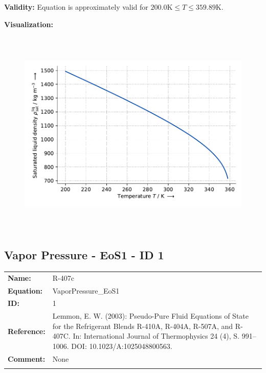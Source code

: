 \textbf{Validity:}
\newline
Equation is approximately valid for $200.0 \si{\kelvin} \leq T \leq 359.89 \si{\kelvin}$.
\newline

\textbf{Visualization:}
%
\begin{figure}[!htp]
{\noindent\includegraphics[height=10cm, keepaspectratio]{figs/ref/ref_R-407c_SaturatedLiquidDensity_EoS1_1.pdf}}
\end{figure}
%

\FloatBarrier
\newpage
\subsection{Vapor Pressure - EoS1 - ID 1}
%
\begin{tabular}[l]{|lp{11.5cm}|}
\hline
\addlinespace

\textbf{Name:} & R-407c \\
\textbf{Equation:} & VaporPressure\_EoS1 \\
\textbf{ID:} & 1 \\
\textbf{Reference:} & Lemmon, E. W. (2003): Pseudo-Pure Fluid Equations of State for the Refrigerant Blends R-410A, R-404A, R-507A, and R-407C. In: International Journal of Thermophysics 24 (4), S. 991–1006. DOI: 10.1023/A:1025048800563. \\
\textbf{Comment:} & None \\

\addlinespace
\hline
\end{tabular}
\newline

